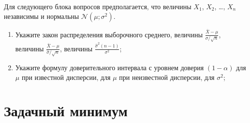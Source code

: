 \documentclass[12pt]{article}
\def \cN{\mathcal{N}}
\begin{document}
Для следующего блока вопросов предполагается, что величины $X_1$, $X_2$, \ldots, $X_n$ независимы и нормальны $\cN(\mu;\sigma^2)$.

\begin{enumerate}[resume]
  \item Укажите закон распределения выборочного среднего, величины $\frac{\bar X - \mu}{\sigma/\sqrt{n}}$, величины $\frac{\bar X - \mu}{\hat\sigma/\sqrt{n}}$, величины $\frac{\hat\sigma^2(n-1)}{\sigma^2}$;
  \item Укажите формулу доверительного интервала с уровнем доверия $(1-\alpha)$ для $\mu$ при известной дисперсии, для $\mu$ при неизвестной дисперсии, для $\sigma^2$;
\end{enumerate}

\newpage
\section{Задачный минимум}
\end{document}
